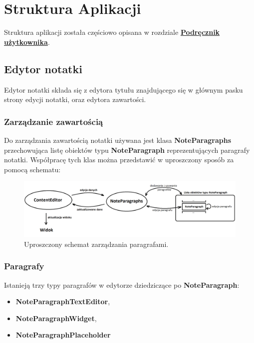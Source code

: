 \chapter{Struktura Aplikacji}

Struktura aplikacji została częściowo opisana w rozdziale \hyperref[ch:manual]{\textbf{Podręcznik użytkownika}}.

\section{Edytor notatki}

Edytor notatki składa się z edytora tytułu znajdującego się w głównym pasku strony edycji notatki, oraz edytora zawartości.

\subsection{Zarządzanie zawartością}

Do zarządzania zawartością notatki używana jest klasa \textbf{NoteParagraphs} przechowująca listę obiektów typu \textbf{NoteParagraph} reprezentujących paragrafy notatki.
Współpracę tych klas można przedstawić w uproszczony sposób za pomocą schematu:

\begin{figure}[ht]
    \centering
    \includegraphics[width=\linewidth]{images/ContentEditor_podzial.png}
    \caption{Uproszczony schemat zarządzania paragrafami.}
\end{figure}

\subsection{Paragrafy}

Istanieją trzy typy paragrafów w edytorze dziedziczące po \textbf{NoteParagraph}: 
\begin{itemize}
    \item \textbf{NoteParagraphTextEditor},
    \item \textbf{NoteParagraphWidget},
    \item \textbf{NoteParagraphPlaceholder}
\end{itemize}

